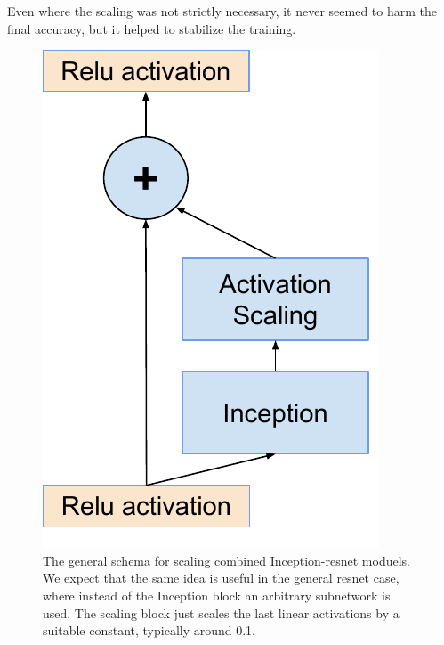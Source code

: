 Even where the scaling was not strictly necessary, it never
seemed to harm the final accuracy, but it helped to stabilize the training.
\begin{figure}
\centering
\includegraphics[width=0.4\linewidth]{resnetscaling}
\caption{The general schema for scaling combined Inception-resnet moduels.
  We expect that the same idea is useful in the general resnet case, where
instead of the Inception block an arbitrary subnetwork is used. The scaling
block just scales the last linear activations by a suitable constant, typically
around 0.1.}
\label{fig:resnetscaling}
\end{figure}

